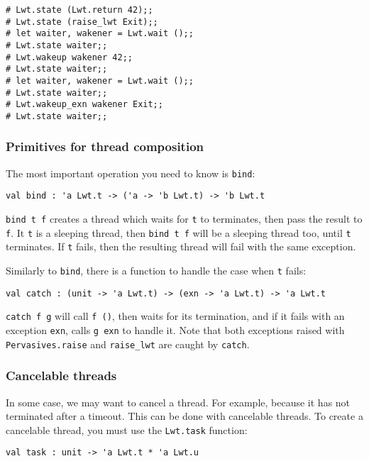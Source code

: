 \documentclass{article}
\begin{document}
\begin{verbatim}
# Lwt.state (Lwt.return 42);;
# Lwt.state (raise_lwt Exit);;
# let waiter, wakener = Lwt.wait ();;
# Lwt.state waiter;;
# Lwt.wakeup wakener 42;;
# Lwt.state waiter;;
# let waiter, wakener = Lwt.wait ();;
# Lwt.state waiter;;
# Lwt.wakeup_exn wakener Exit;;
# Lwt.state waiter;;
\end{verbatim}

\subsubsection{Primitives for thread composition}

The most important operation you need to know is \texttt{bind}:

\begin{verbatim}
val bind : 'a Lwt.t -> ('a -> 'b Lwt.t) -> 'b Lwt.t
\end{verbatim}

\texttt{bind t f} creates a thread which waits for \texttt{t} to
terminates, then pass the result to \texttt{f}. It \texttt{t} is a
sleeping thread, then \texttt{bind t f} will be a sleeping thread too,
until \texttt{t} terminates. If \texttt{t} fails, then the resulting
thread will fail with the same exception.

Similarly to \texttt{bind}, there is a function to handle the case
when \texttt{t} fails:

\begin{verbatim}
val catch : (unit -> 'a Lwt.t) -> (exn -> 'a Lwt.t) -> 'a Lwt.t
\end{verbatim}

\texttt{catch f g} will call \texttt{f ()}, then waits for its
termination, and if it fails with an exception \texttt{exn}, calls
\texttt{g exn} to handle it. Note that both exceptions raised with
\texttt{Pervasives.raise} and \texttt{raise_lwt} are caught by
\texttt{catch}.

\subsubsection{Cancelable threads}

In some case, we may want to cancel a thread. For example, because it
has not terminated after a timeout. This can be done with cancelable
threads. To create a cancelable thread, you must use the
\texttt{Lwt.task} function:

\begin{verbatim}
val task : unit -> 'a Lwt.t * 'a Lwt.u
\end{verbatim}
\end{document}
